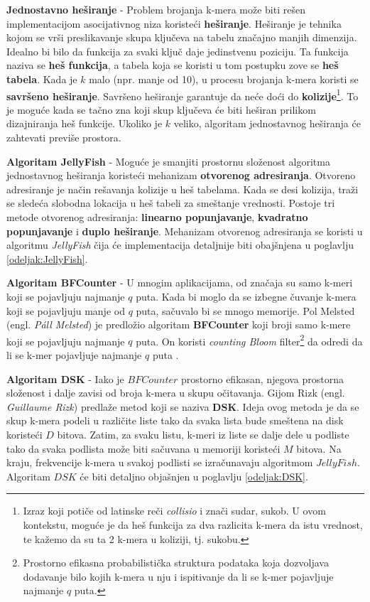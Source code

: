\documentclass[12pt,oneside]{memoir}
\begin{document}
\textbf{Jednostavno heširanje} - Problem brojanja k-mera može biti rešen implementacijom asocijativnog niza koristeći \textbf{heširanje}. Heširanje je tehnika kojom se vrši preslikavanje skupa ključeva na tabelu značajno manjih dimenzija. Idealno bi bilo da funkcija za svaki ključ
daje jedinstvenu poziciju. Ta funkcija naziva se \textbf{heš funkcija}, a tabela koja se koristi u tom
postupku zove se \textbf{heš tabela}. Kada je $k$ malo (npr. manje od 10), u procesu brojanja k-mera koristi se \textbf{savršeno heširanje}. Savršeno heširanje garantuje da neće doći do \textbf{kolizije}\footnote{Izraz koji potiče od latinske reči \textit{collisio} i znači sudar, sukob. U ovom kontekstu, moguće je da heš funkcija za dva razlicita k-mera da istu vrednost, te kažemo da su ta 2 k-mera u koliziji, tj. sukobu.}. To je moguće kada se tačno zna koji skup ključeva će biti heširan prilikom dizajniranja heš funkcije. Ukoliko je $k$ veliko, algoritam jednostavnog heširanja će zahtevati previše prostora.

\textbf{Algoritam JellyFish} - Moguće je smanjiti prostornu složenost algoritma jednostavnog heširanja koristeći mehanizam \textbf{otvorenog adresiranja}. Otvoreno adresiranje je način rešavanja kolizije u heš tabelama. Kada se desi kolizija, traži se sledeća slobodna lokacija u heš tabeli za smeštanje vrednosti. Postoje tri metode otvorenog adresiranja: \textbf{linearno popunjavanje}, \textbf{kvadratno popunjavanje} i \textbf{duplo heširanje}. Mehanizam otvorenog adresiranja se koristi u algoritmu \textit{JellyFish} čija će implementacija detaljnije biti obajšnjena u poglavlju \ref{odeljak:JellyFish}.

\textbf{Algoritam BFCounter} - U mnogim aplikacijama, od značaja su samo k-meri koji se pojavljuju najmanje $q$ puta. Kada bi moglo da se izbegne čuvanje k-mera koji se pojavljuju manje od $q$ puta, sačuvalo bi se mnogo memorije. Pol Melsted (engl. \textit{Páll Melsted}) je predložio algoritam  \textbf{BFCounter} koji broji samo k-mere koji se pojavljuju najmanje $q$ puta. On koristi \textit{counting Bloom} filter\footnote{Prostorno efikasna probabilistička struktura podataka koja dozvoljava dodavanje bilo kojih k-mera u nju i ispitivanje da li se k-mer pojavljuje najmanje $q$ puta.} da odredi da li se k-mer pojavljuje najmanje $q$ puta \cite{WingKinSung}.

\textbf{Algoritam DSK} - Iako je $BFCounter$ prostorno efikasan, njegova prostorna složenost i dalje zavisi od broja  k-mera u skupu očitavanja. Gijom Rizk (engl. \textit{Guillaume Rizk}) predlaže metod koji se naziva \textbf{DSK}. Ideja ovog metoda je da se skup k-mera podeli u različite liste tako da svaka lista bude smeštena na disk koristeći $D$ bitova. Zatim, za svaku listu, k-meri iz liste se dalje dele u podliste tako da svaka podlista može biti sačuvana u memoriji koristeći $M$ bitova. Na kraju, frekvencije k-mera u svakoj podlisti se izračunavaju algoritmom $JellyFish$. Algoritam $DSK$ će biti detaljno objašnjen u poglavlju \ref{odeljak:DSK}.
\end{document}
